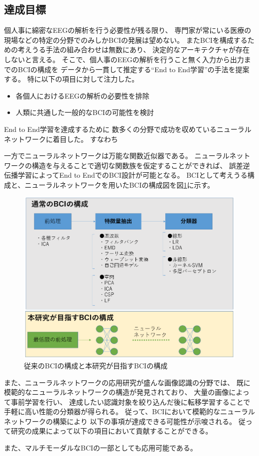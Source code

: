 \subsection{\mc 達成目標}
個人事に綿密なEEGの解析を行う必要性が残る限り、
専門家が常にいる医療の現場などの特定の分野でのみしかBCIの発展は望めない。
またBCIを構成するための考えうる手法の組み合わせは無数にあり、
決定的なアーキテクチャが存在しないと言える。
そこで、個人事のEEGの解析を行うこと無く入力から出力までのBCIの構成を
データから一貫して推定する``End to End学習''の手法を提案する。
特に以下の項目に対して注力した。
\begin{itemize}
    \item 各個人におけるEEGの解析の必要性を排除
    \item 人類に共通した一般的なBCIの可能性を検討
\end{itemize}

End to End学習を達成するために
数多くの分野で成功を収めているニューラルネットワークに着目した。
すなわち

一方でニューラルネットワークは万能な関数近似器である。
ニューラルネットワークの構造を与えることで適切な関数族を仮定することができれば、
誤差逆伝播学習によってEnd to EndでのBCI設計が可能となる。
BCIとして考えうる構成と、ニューラルネットワークを用いたBCIの構成図を図\ref{fig:BCIpattern}に示す。
\begin{figure}
    \centering
    \includegraphics[width=12cm]{images/BCIpattern.PNG}
    \caption{従来のBCIの構成と本研究が目指すBCIの構成}
    \label{fig:BCIpattern}
\end{figure}

また、ニューラルネットワークの応用研究が盛んな画像認識の分野では、
既に模範的なニューラルネットワークの構造が発見されており、
大量の画像によって事前学習を行い、
達成したい認識対象を絞り込んだ後に転移学習することで
手軽に高い性能の分類器が得られる。
従って、BCIにおいて模範的なニューラルネットワークの構築により
以下の事項が達成できる可能性が示唆される。
従って研究の成果によって以下の項目において貢献することができる。

また、マルチモーダルなBCIの一部としても応用可能である。



